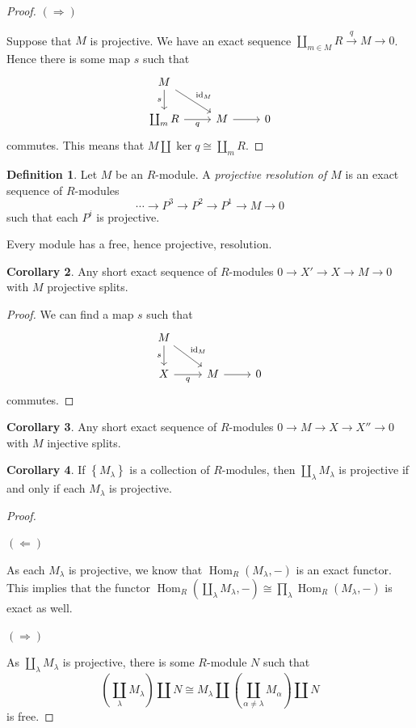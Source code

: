 \documentclass[10pt,letterpaper,cm]{nupset}
\theoremstyle{definition}
\newtheorem{definition}{Definition}[subsection]
\theoremstyle{theorem}
\newtheorem{corollary}[definition]{Corollary}
\theoremstyle{remark}
\newcommand{\1}{\mathbf{1}}
\newcommand{\0}{\vec 0}
\DeclareMathOperator{\id}{\mathrm{id}}
\DeclareMathOperator{\Hom}{Hom}
\begin{document}
\begin{proof}
\medskip

 $(\Longrightarrow)$ 
 
 Suppose that $M$ is projective. We have an exact sequence $\coprod_{m\in M}R \overset{q}{\longrightarrow}  M \to 0$. Hence there is some map $s$ such that 
\[\begin{tikzcd}
M \arrow[rd, "\id_M"] \arrow[d, "s"'] &  &  \\
\coprod_m R \arrow[r, "q"'] & M \arrow[r] & 0
\end{tikzcd}
\] commutes. This means that $M \coprod \ker{q} \cong \coprod_m R$.
\end{proof}

\begin{definition}
Let $M$ be an $R$-module. A \textit{projective resolution of $M$} is an exact sequence of $R$-modules $$\cdots \to P^3 \to P^2 \to P^1 \to M \to 0$$ such that each $P^i$ is projective.  
\end{definition}


Every module has a free, hence projective, resolution. 


\begin{corollary}
Any short exact sequence of $R$-modules $0 \to X' \to X \to M \to 0$ with $M$ projective splits. 
\end{corollary}
\begin{proof}
We can find a map $s$ such that
\[\begin{tikzcd}
M \arrow[rd, "\id_M"] \arrow[d, "s"'] &  &  \\
X \arrow[r, "q"'] & M \arrow[r] & 0
\end{tikzcd}
\] commutes. 
\end{proof}

\begin{corollary}
Any short exact sequence of $R$-modules $0 \to M \to X \to X'' \to 0$ with $M$ injective splits. 
\end{corollary}

\begin{corollary}
If $\left\{M_{\lambda}\right\}$ is a collection of $R$-modules, then $\coprod_{\lambda} M_{\lambda}$ is projective  if and only if each $M_{\lambda}$ is projective. 
\end{corollary}
\begin{proof} $ $

\smallskip

$(\Longleftarrow)$ 

As each $M_{\lambda}$ is projective, we know that $\Hom_R(M_{\lambda}, -)$ is an exact functor. This implies that the functor $\Hom_R\left(\coprod_{\lambda} M_{\lambda}, {-}\right) \cong \prod_{\lambda} \Hom_R(M_{\lambda}, -)$ is exact as well.

\medskip

 
$(\Longrightarrow)$ 

As $\coprod_{\lambda} M_{\lambda}$ is projective, there is some $R$-module $N$ such that $$\left(\coprod_{\lambda} M_{\lambda}\right) \coprod N \cong M_{\lambda} \coprod  \left(\coprod_{\alpha \ne \lambda} M_{\alpha}\right)\coprod N$$ is free.
\end{proof}
\end{document}

